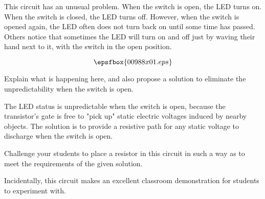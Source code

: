 

This circuit has an unusual problem.  When the switch is open, the LED turns on.  When the switch is closed, the LED turns off.  However, when the switch is opened again, the LED often does not turn back on until some time has passed.  Others notice that sometimes the LED will turn on and off just by waving their hand next to it, with the switch in the open position.

$$\epsfbox{00988x01.eps}$$

Explain what is happening here, and also propose a solution to eliminate the unpredictability when the switch is open.







The LED status is unpredictable when the switch is open, because the transistor's gate is free to "pick up" static electric voltages induced by nearby objects.  The solution is to provide a resistive path for any static voltage to discharge when the switch is open.







Challenge your students to place a resistor in this circuit in such a way as to meet the requirements of the given solution.

Incidentally, this circuit makes an excellent classroom demonstration for students to experiment with.




